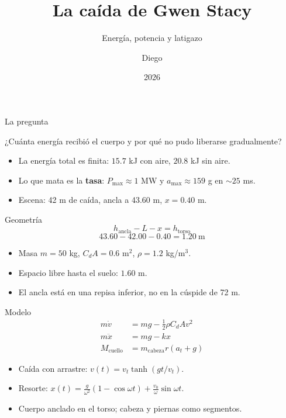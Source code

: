 \documentclass[aspectratio=169,11pt]{beamer}
\title{La caída de Gwen Stacy}
\subtitle{Energía, potencia y latigazo}
\author{Diego}
\institute{Métodos Numéricos}
\date{2026}
\begin{document}
\begin{frame}
  \titlepage
\end{frame}

\begin{frame}{La pregunta}
  \begin{block}{}
    ¿Cuánta energía recibió el cuerpo y por qué no pudo liberarse gradualmente?
  \end{block}
  \begin{itemize}
    \item La energía total es finita: \(15.7\) kJ con aire, \(20.8\) kJ sin aire.
    \item Lo que mata es la \textbf{tasa}: \(P_{\max}\approx 1\) MW y
          \(a_{\max}\approx 159\) g en \(\sim 25\) ms.
    \item Escena: 42 m de caída, ancla a 43.60 m, \(x=0.40\) m.
  \end{itemize}
\end{frame}

\begin{frame}{Geometría}
  \[
    h_{\text{ancla}} - L - x = h_{\text{torso}}
  \]
  \[
    43.60 - 42.00 - 0.40 = 1.20\ \text{m}
  \]
  \begin{itemize}
    \item Masa \(m=50\) kg, \(C_dA=0.6\) m\(^2\), \(\rho=1.2\) kg/m\(^3\).
    \item Espacio libre hasta el suelo: \(1.60\) m.
    \item El ancla está en una repisa inferior, no en la cúspide de 72 m.
  \end{itemize}
\end{frame}

\begin{frame}{Modelo}
  \begin{align*}
    m\dot v &= mg - \tfrac12\rho C_dA v^2 \\
    m\ddot x &= mg - kx \\
    M_{\text{cuello}} &= m_{\text{cabeza}} r (a_t+g)
  \end{align*}
  \begin{itemize}
    \item Caída con arrastre: \(v(t)=v_t\tanh(gt/v_t)\).
    \item Resorte: \(x(t)=\frac{g}{\omega^2}(1-\cos\omega t)+\frac{v_0}{\omega}\sin\omega t\).
    \item Cuerpo anclado en el torso; cabeza y piernas como segmentos.
  \end{itemize}
\end{frame}
\end{document}
